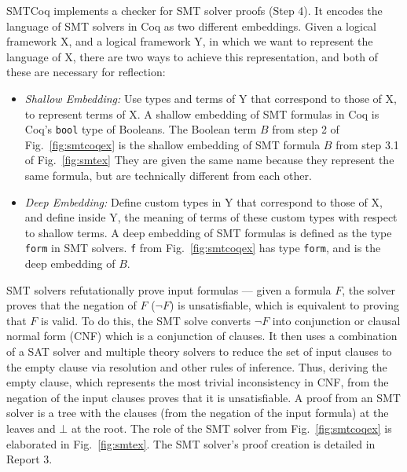 \documentclass{article}
\begin{document}
	SMTCoq implements a checker for 
	SMT solver proofs (Step 4). It 
	encodes the language of SMT solvers
	in Coq as two different embeddings. 
	Given a logical framework X, and 
	a logical framework Y, in which we 
	want to represent the language of X, 
	there are two ways to achieve this
	representation, and 
	both of these are necessary for 
	reflection:
	\begin{itemize}
		\item \textit{Shallow Embedding: }
		Use types and terms of Y that 
		correspond to those of X, to 
		represent terms of X. A shallow
		embedding of SMT formulas in 
		Coq is Coq's \texttt{bool} 
		type of Booleans. The Boolean 
		term $B$ from step 2 of 
		Fig.~\ref{fig:smtcoqex}
		is the shallow embedding of SMT 
		formula $B$ from step 3.1 of 
		Fig.~\ref{fig:smtex}
		They are given the same name because 
		they represent the same formula, but 
		are technically different from each 
		other.
		\item\textit{Deep Embedding: }
		Define custom types in Y that 
		correspond to those of X, and 
		define inside Y, the meaning of 
		terms of these custom types with 
		respect to shallow terms. A 
		deep embedding of SMT formulas 
		is defined as the type 
		\texttt{form} in SMT solvers.
		\texttt{f} from 
		Fig.~\ref{fig:smtcoqex} has
		type \texttt{form}, and is 
		the deep embedding of $B$.
	\end{itemize}
	
	SMT solvers refutationally prove 
	input formulas --- given a formula
	$F$, the solver proves that the 
	negation of $F$ ($\neg F$) is 
	unsatisfiable, which is equivalent
	to proving that $F$ is valid. 
	To do this, the SMT solve converts 
	$\neg F$ into conjunction or clausal 
	normal form (CNF) which is a 
	conjunction of clauses. It then uses 
	a combination of a SAT solver and 
	multiple theory	solvers to reduce 
	the set of input clauses to the 
	empty clause via resolution
	and other rules of inference. Thus,
	deriving the empty clause, which 
	represents the most trivial
	inconsistency in CNF, from the 
	negation of the input clauses proves 
	that it is unsatisfiable. A proof
	from an SMT solver is a tree 
	with the clauses (from the 
	negation of the input formula) at
	the leaves and $\bot$
	at the root. The role of the SMT
	solver from Fig.~\ref{fig:smtcoqex}
	is elaborated in Fig.~\ref{fig:smtex}.
	The SMT solver's proof creation is 
	detailed in Report 3.
	
\end{document}
